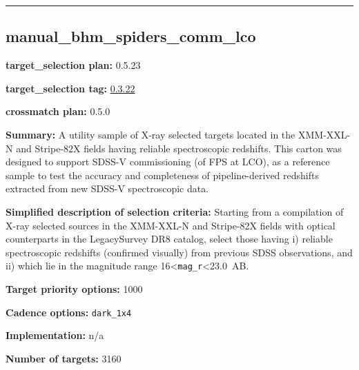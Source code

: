 \begin{center}\rule{0.5\linewidth}{0.5pt}\end{center}

\hypertarget{manual_bhm_spiders_comm_lco_plan0.5.23}{%
\subsection{manual\_bhm\_spiders\_comm\_lco}\label{manual_bhm_spiders_comm_lco_plan0.5.23}}

\noindent\textbf{target\_selection plan:} 0.5.23

\noindent\textbf{target\_selection tag:}
\href{https://github.com/sdss/target_selection/tree/0.3.22/}{0.3.22}

\noindent\textbf{crossmatch plan:} 0.5.0

\noindent\textbf{Summary:} A utility sample of X-ray selected targets located in
the XMM-XXL-N and Stripe-82X fields having reliable spectroscopic
redshifts. This carton was designed to support SDSS-V commissioning (of
FPS at LCO), as a reference sample to test the accuracy and completeness
of pipeline-derived redshifts extracted from new SDSS-V spectroscopic
data.

\noindent\textbf{Simplified description of selection criteria:} Starting from a
compilation of X-ray selected sources in the XMM-XXL-N and Stripe-82X
fields with optical counterparts in the LegacySurvey DR8 catalog, select
those having i) reliable spectroscopic redshifts (confirmed visually)
from previous SDSS observations, and ii) which lie in the magnitude
range 16\textless{}\texttt{mag\_r}\textless23.0~AB.


\noindent\textbf{Target priority options:} 1000

\noindent\textbf{Cadence options:} \texttt{dark\_1x4}

\noindent\textbf{Implementation:} n/a

\noindent\textbf{Number of targets:} 3160
